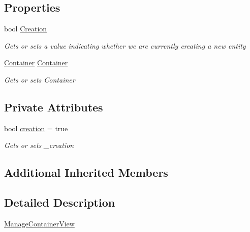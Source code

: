 \subsection*{Properties}
\begin{DoxyCompactItemize}
\item 
bool \mbox{\hyperlink{class_gtd_app_1_1_console_1_1_views_1_1_containers_1_1_manage_container_view_a50234b05f0b077306c32581dfab5edca}{Creation}}
\begin{DoxyCompactList}\small\item\em Gets or sets a value indicating whether we are currently creating a new entity \end{DoxyCompactList}\item 
\mbox{\hyperlink{class_gtd_app_1_1_data_1_1_container}{Container}} \mbox{\hyperlink{class_gtd_app_1_1_console_1_1_views_1_1_containers_1_1_manage_container_view_a1058aa896f402e4e39756b90f1fff11c}{Container}}
\begin{DoxyCompactList}\small\item\em Gets or sets Container \end{DoxyCompactList}\end{DoxyCompactItemize}
\subsection*{Private Attributes}
\begin{DoxyCompactItemize}
\item 
bool \mbox{\hyperlink{class_gtd_app_1_1_console_1_1_views_1_1_containers_1_1_manage_container_view_aec406c52e010db5466381f2de89f330d}{creation}} = true
\begin{DoxyCompactList}\small\item\em Gets or sets \+\_\+creation \end{DoxyCompactList}\end{DoxyCompactItemize}
\subsection*{Additional Inherited Members}


\subsection{Detailed Description}
\mbox{\hyperlink{class_gtd_app_1_1_console_1_1_views_1_1_containers_1_1_manage_container_view}{Manage\+Container\+View}} 



